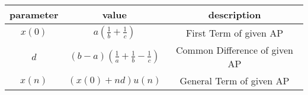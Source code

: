 
  \centering
  \begin{tabular}{|c|c|c|}
  \hline
    parameter & value & description \\
    \hline
    $x(0)$ & $a\left(\frac{1}{b} + \frac{1}{c}\right)$ & First Term of given AP \\
    \hline
    $d$ & $(b - a)(\frac{1}{a} + \frac{1}{b} - \frac{1}{c})$ & Common Difference of given AP \\
    \hline
    $x(n)$ & $(x(0) + nd)u(n)$ & General Term of given AP \\
    \hline
  \end{tabular}

